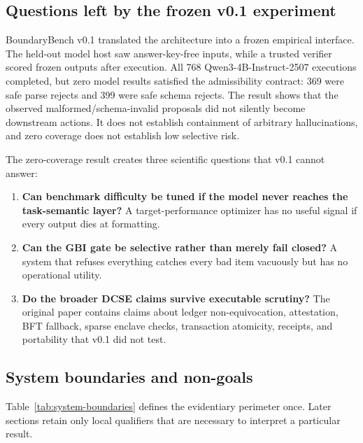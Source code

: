 \documentclass[11pt]{article}
\begin{document}
\subsection{Questions left by the frozen v0.1 experiment}

BoundaryBench v0.1 translated the architecture into a frozen empirical interface. The held-out model host saw answer-key-free inputs, while a trusted verifier scored frozen outputs after execution. All 768 Qwen3-4B-Instruct-2507 executions completed, but zero model results satisfied the admissibility contract: 369 were safe parse rejects and 399 were safe schema rejects. The result shows that the observed malformed/schema-invalid proposals did not silently become downstream actions. It does not establish containment of arbitrary hallucinations, and zero coverage does not establish low selective risk.

The zero-coverage result creates three scientific questions that v0.1 cannot answer:
\begin{enumerate}
  \item \textbf{Can benchmark difficulty be tuned if the model never reaches the task-semantic layer?} A target-performance optimizer has no useful signal if every output dies at formatting.
  \item \textbf{Can the GBI gate be selective rather than merely fail closed?} A system that refuses everything catches every bad item vacuously but has no operational utility.
  \item \textbf{Do the broader DCSE claims survive executable scrutiny?} The original paper contains claims about ledger non-equivocation, attestation, BFT fallback, sparse enclave checks, transaction atomicity, receipts, and portability that v0.1 did not test.
\end{enumerate}

\subsection{System boundaries and non-goals}
\label{sec:boundaries}

Table~\ref{tab:system-boundaries} defines the evidentiary perimeter once. Later sections retain only local qualifiers that are necessary to interpret a particular result.
\end{document}
